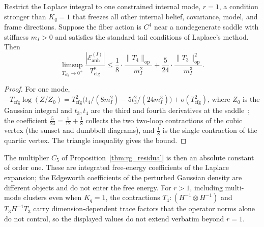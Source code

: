 \begin{proposition}
\label{thm:rg_residual_explicit}
Restrict the Laplace integral to one constrained internal mode, $r=1$, a condition stronger than $K_q=1$ that freezes all other internal belief, covariance, model, and frame directions. Suppose the fiber action is $C^4$ near a nondegenerate saddle with stiffness $m_I>0$ and satisfies the standard tail conditions of Laplace's method. Then
\begin{equation}
\limsup_{T_{\mathrm{cfg}}\to0^+}\frac{|\mathcal{E}_{\mathrm{anh}}^{(I)}|}{T_{\mathrm{cfg}}^2} \leq \frac{1}{8} \cdot \frac{\|T_4\|_{\mathrm{op}}}{m_I^2} + \frac{5}{24} \cdot \frac{\|T_3\|_{\mathrm{op}}^2}{m_I^3}.
\label{eq:rg_C5_explicit}
\end{equation}
\end{proposition}

\begin{proof}
For one mode, $-T_{\mathrm{cfg}}\log(Z/Z_0)=T_{\mathrm{cfg}}^2\big(t_4/(8m_I^2)-5t_3^2/(24m_I^3)\big)+o(T_{\mathrm{cfg}}^2)$, where $Z_0$ is the Gaussian integral and $t_3,t_4$ are the third and fourth derivatives at the saddle~\cite{BenderOrszag1999, wong2001asymptotic}; the coefficient $\tfrac{5}{24}=\tfrac{1}{12}+\tfrac{1}{8}$ collects the two two-loop contractions of the cubic vertex (the sunset and dumbbell diagrams), and $\tfrac18$ is the single contraction of the quartic vertex. The triangle inequality gives the bound.
\end{proof}

The multiplier $C_5$ of Proposition~\ref{thm:rg_residual} is then an absolute constant of order one. These are integrated free-energy coefficients of the Laplace expansion; the Edgeworth coefficients of the perturbed Gaussian density are different objects and do not enter the free energy. For $r>1$, including multi-mode clusters even when $K_q=1$, the contractions $T_4 \mathbin{:} (H^{-1} \otimes H^{-1})$ and $T_3 H^{-1} T_3$ carry dimension-dependent trace factors that the operator norms alone do not control, so the displayed values do not extend verbatim beyond $r=1$.

